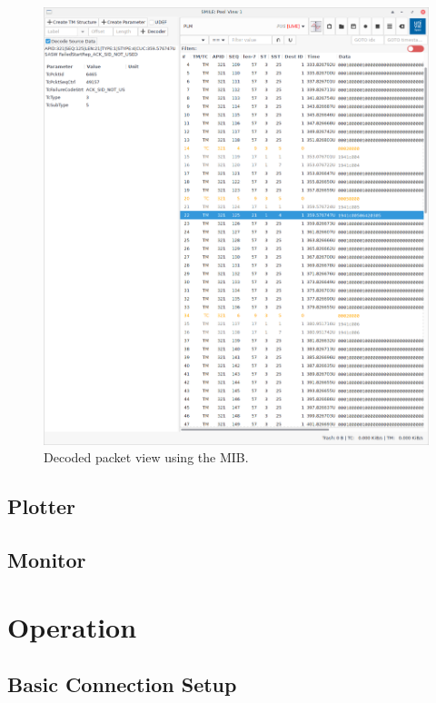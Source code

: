 \begin{figure}\label{fig:pvdec}
\includegraphics[width=1.\textwidth]{../shared/images/pvdec.png} 
\caption{Decoded packet view using the MIB.}
\end{figure}

\subsection{Plotter}

\subsection{Monitor}

\section{Operation}



\clearpage
\subsection{Basic Connection Setup}


